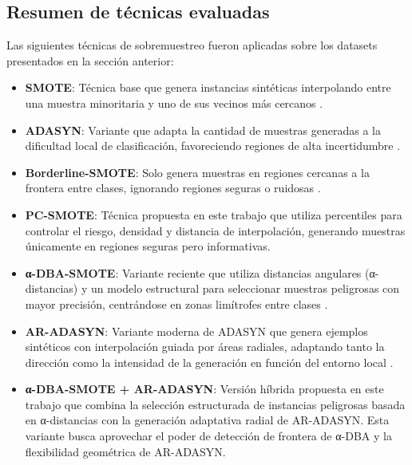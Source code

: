 \subsection{Resumen de técnicas evaluadas}

Las siguientes técnicas de sobremuestreo fueron aplicadas sobre los datasets presentados en la sección anterior:

\begin{itemize}
    \item \textbf{SMOTE}: Técnica base que genera instancias sintéticas interpolando entre una muestra minoritaria y uno de sus vecinos más cercanos \parencite{chawla2002smote}.
    
    \item \textbf{ADASYN}: Variante que adapta la cantidad de muestras generadas a la dificultad local de clasificación, favoreciendo regiones de alta incertidumbre \parencite{he2008adasyn}.
    
    \item \textbf{Borderline-SMOTE}: Solo genera muestras en regiones cercanas a la frontera entre clases, ignorando regiones seguras o ruidosas \parencite{han2005borderline}.
    
    \item \textbf{PC-SMOTE}: Técnica propuesta en este trabajo que utiliza percentiles para controlar el riesgo, densidad y distancia de interpolación, generando muestras únicamente en regiones seguras pero informativas.
    
    \item \textbf{α-DBA-SMOTE}: Variante reciente que utiliza distancias angulares (α-distancias) y un modelo estructural para seleccionar muestras peligrosas con mayor precisión, centrándose en zonas limítrofes entre clases \parencite{park2024radius}.
    
    \item \textbf{AR-ADASYN}: Variante moderna de ADASYN que genera ejemplos sintéticos con interpolación guiada por áreas radiales, adaptando tanto la dirección como la intensidad de la generación en función del entorno local \parencite{park2024radius}.
    
    \item \textbf{α-DBA-SMOTE + AR-ADASYN}: Versión híbrida propuesta en este trabajo que combina la selección estructurada de instancias peligrosas basada en α-distancias con la generación adaptativa radial de AR-ADASYN. Esta variante busca aprovechar el poder de detección de frontera de α-DBA y la flexibilidad geométrica de AR-ADASYN.
\end{itemize}

